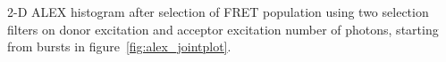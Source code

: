 2-D ALEX histogram after selection of FRET population using two selection filters on donor excitation and acceptor excitation number of photons, starting from bursts in figure~\ref{fig:alex_jointplot}.
